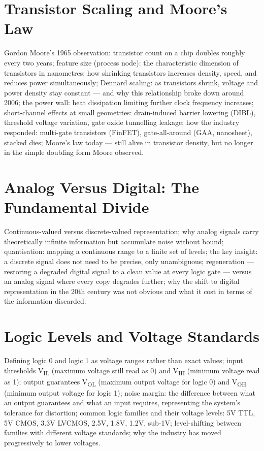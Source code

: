 \chapter{Transistor Scaling and Moore's Law}
\label{ch:transistor-scaling}

Gordon Moore's 1965 observation: transistor count on a chip doubles roughly
every two years; feature size (process node): the characteristic dimension
of transistors in nanometres; how shrinking transistors increases density,
speed, and reduces power simultaneously; Dennard scaling: as transistors
shrink, voltage and power density stay constant — and why this relationship
broke down around 2006; the power wall: heat dissipation limiting further
clock frequency increases; short-channel effects at small geometries:
drain-induced barrier lowering (DIBL), threshold voltage variation, gate
oxide tunnelling leakage; how the industry responded: multi-gate transistors
(FinFET), gate-all-around (GAA, nanosheet), stacked dies; Moore's law
today — still alive in transistor density, but no longer in the simple
doubling form Moore observed.



\chapter{Analog Versus Digital: The Fundamental Divide}
\label{ch:analog-vs-digital}

Continuous-valued versus discrete-valued representation; why analog signals
carry theoretically infinite information but accumulate noise without bound;
quantisation: mapping a continuous range to a finite set of levels;
the key insight: a discrete signal does not need to be precise, only
unambiguous; regeneration — restoring a degraded digital signal to a clean
value at every logic gate — versus an analog signal where every copy
degrades further; why the shift to digital representation in the 20th
century was not obvious and what it cost in terms of the information
discarded.

\chapter{Logic Levels and Voltage Standards}
\label{ch:logic-levels}

Defining logic 0 and logic 1 as voltage ranges rather than exact values;
input thresholds V\textsubscript{IL} (maximum voltage still read as 0) and
V\textsubscript{IH} (minimum voltage read as 1); output guarantees
V\textsubscript{OL} (maximum output voltage for logic 0) and
V\textsubscript{OH} (minimum output voltage for logic 1); noise margin:
the difference between what an output guarantees and what an input requires,
representing the system's tolerance for distortion; common logic families
and their voltage levels: 5V TTL, 5V CMOS, 3.3V LVCMOS, 2.5V, 1.8V,
1.2V, sub-1V; level-shifting between families with different voltage
standards; why the industry has moved progressively to lower voltages.

